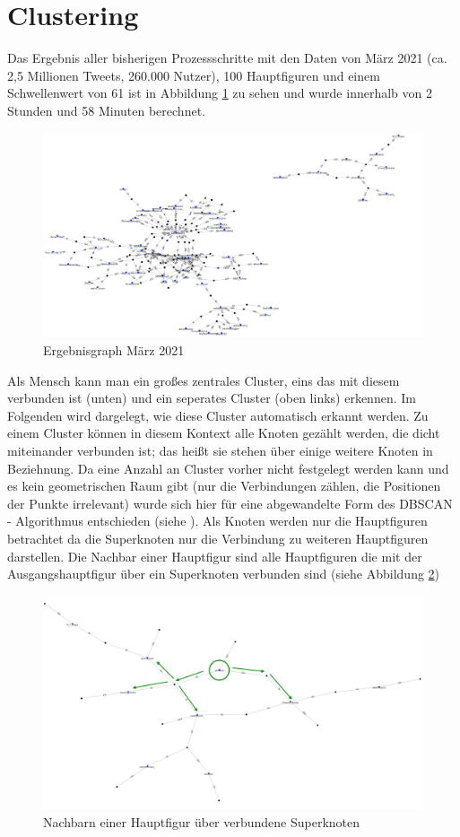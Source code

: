 \section{Clustering}
Das Ergebnis aller bisherigen Prozessschritte mit den Daten von März 2021 (ca. 2,5 Millionen Tweets, 260.000 Nutzer), 100 Hauptfiguren und einem Schwellenwert von 61 ist in Abbildung \ref{fig:noclusters} zu sehen und wurde innerhalb von 2 Stunden und 58 Minuten berechnet. 
\begin{figure}[h!]
	\centering
	\includegraphics[width=\linewidth]{images/NoClusters}
	\caption[]{Ergebnisgraph März 2021}
	\label{fig:noclusters}
\end{figure}
Als Mensch kann man ein  großes zentrales \gls{Cluster}, eins das mit diesem verbunden ist (unten) und ein seperates \gls{Cluster} (oben links) erkennen. 
Im Folgenden wird dargelegt, wie diese \gls{Cluster} automatisch erkannt werden.
Zu einem \gls{Cluster} können in diesem Kontext alle Knoten gezählt werden, die dicht miteinander verbunden ist; das heißt sie stehen über einige weitere Knoten in Beziehnung.
Da eine Anzahl an \gls{Cluster} vorher nicht festgelegt werden kann und es kein geometrischen Raum gibt (nur die Verbindungen zählen, die Positionen der Punkte irrelevant) wurde sich hier für eine abgewandelte Form des DBSCAN - Algorithmus entschieden (siehe ).
Als Knoten werden nur die Hauptfiguren betrachtet da die Superknoten nur die Verbindung zu weiteren Hauptfiguren darstellen. 
Die Nachbar einer Hauptfigur sind alle Hauptfiguren die mit der Ausgangshauptfigur über ein Superknoten verbunden sind (siehe Abbildung \ref{fig:dbscan-neighbours})
\begin{figure}
	\centering
	\includegraphics[width=0.7\linewidth]{images/DBSCAN-neighbours}
	\caption[]{Nachbarn einer Hauptfigur über verbundene Superknoten}
	\label{fig:dbscan-neighbours}
\end{figure}
